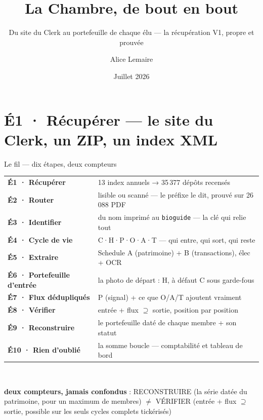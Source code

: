 \documentclass[11pt,aspectratio=169]{beamer}
\title[La Chambre, de bout en bout]{La Chambre, de bout en bout}
\subtitle{Du site du Clerk au portefeuille de chaque élu — la récupération V1, propre et prouvée}
\author[A.~Lemaire]{Alice Lemaire}
\institute[Ramify]{Document de recherche — livrable Ramify}
\date{Juillet 2026}
\newcommand{\co}[1]{\texttt{#1}}
\begin{document}
\section{É1 · Récupérer — le site du Clerk, un ZIP, un index XML}


\begin{frame}[plain]
  \titlepage
\end{frame}

\begin{frame}{Le fil — dix étapes, deux compteurs}
  \centering
  {\footnotesize\setlength{\tabcolsep}{5pt}\renewcommand{\arraystretch}{1.12}
  \begin{tabular}{l l}
    \textbf{É1 · Récupérer} & 13 index annuels → 35\,377 dépôts recensés \\
    \textbf{É2 · Router} & lisible ou scanné — le préfixe le dit, prouvé sur 26\,088 PDF \\
    \textbf{É3 · Identifier} & du nom imprimé au \co{bioguide} — la clé qui relie tout \\
    \textbf{É4 · Cycle de vie} & C·H·P·O·A·T — qui entre, qui sort, qui reste \\
    \textbf{É5 · Extraire} & Schedule A (patrimoine) + B (transactions), élec + OCR \\
    \textbf{É6 · Portefeuille d'entrée} & la photo de départ : H, à défaut C sous garde-fous \\
    \textbf{É7 · Flux dédupliqués} & P (signal) + ce que O/A/T ajoutent vraiment \\
    \textbf{É8 · Vérifier} & entrée + flux $\supseteq$ sortie, position par position \\
    \textbf{É9 · Reconstruire} & le portefeuille daté de chaque membre + son statut \\
    \textbf{É10 · Rien d'oublié} & la somme boucle — comptabilité et tableau de bord \\
  \end{tabular}}\\[2.5mm]
  \colorbox{helec}{\parbox{0.92\textwidth}{\footnotesize\color{white}\centering
    \textbf{deux compteurs, jamais confondus} : RECONSTRUIRE (la série datée du
    patrimoine, pour un maximum de membres) $\neq$ VÉRIFIER (entrée + flux
    $\supseteq$ sortie, possible sur les seuls cycles complets tickérisés)}}
\end{frame}
\end{document}
